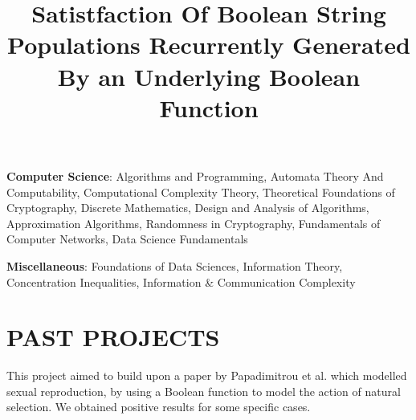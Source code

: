 \documentclass[margin]{res}
\begin{document}
\begin{resume}
\par
\textbf{Computer Science}:
Algorithms and Programming, Automata Theory And Computability, Computational Complexity Theory, Theoretical Foundations of Cryptography, Discrete Mathematics, Design and Analysis of Algorithms, Approximation Algorithms, Randomness in Cryptography, Fundamentals of Computer Networks, Data Science Fundamentals

\par
\textbf{Miscellaneous}:
Foundations of Data Sciences, Information Theory, Concentration Inequalities, Information \& Communication Complexity
\fi


\iffalse

\section{EVENTS \& CONFERENCES}

\textbf{Symposium on Learning, Algorithms and Complexity}, a National Mathematics Initiative (NMI) event organized at the Indian Institute of Science in January 2015.
\par

\textbf{INDOCRYPT 2015},  held at IISc, in December 2015.

\textbf{BITS 2016}, a workshop on information theory also attended by computer scientists, held at IIT Bombay and TIFR, in January 2016.

\textbf{CRYPTO 2018 \& 2019},  at USCB, in August 2018 \& 2019.

\textbf{New York Crypto Days}, several throughout 2017 - 2019.

\textbf{NYCAC 2017 \& 2018}, an annual theory day held at CUNY.

\textbf{Columbia/NYU Theory Day 2017 \& 2018}, an annual theory day held at Columbia University or NYU.


\fi



\iffalse

\section{PAST PROJECTS}

\title{\textbf{Satistfaction Of Boolean String Populations Recurrently Generated By an Underlying Boolean Function}}
\begin{position}
This project aimed to build upon a paper by Papadimitrou et al. which modelled sexual reproduction, by using a Boolean function to model the action of natural selection. We obtained positive results for some specific cases.
\end{position}


\end{resume}
\end{document}
